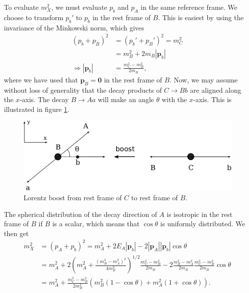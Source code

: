 \documentclass[twoside,english]{uiofysmaster}
\begin{document}
To evaluate $m_X^2$, we must evaluate $p_b$ and $p_A$ in the same reference frame. We choose to transform $p_b'$ to $p_b$ in the rest frame of $B$. This is easiest by using the invariance of the Minkowski norm, which gives
\begin{align}
	(p_b + p_B)^2 &= (p_b' + p_B')^2 = m_C^2\nonumber \\
				  &= m_B^2 + 2m_B|\mathbf{p}_b|\\
	\Rightarrow |\mathbf{p}_b| &= \frac{m_C^2 - m_B^2}{2m_B},\nonumber
\end{align}
where we have used that $\mathbf p_B = \mathbf{0}$ in the rest frame of $B$. Now, we may assume without loss of generality that the decay products of $C\to Bb$ are aligned along the $x$-axis. The decay $B\to Aa$ will make an angle $\theta$ with the $x$-axis. This is illustrated in figure \ref{fig:lorentz_boost}. 
\begin{figure}[hbt]
\centering
\includegraphics[scale=0.7]{figures/appendix/lorentz_boost.pdf}
\caption{Lorentz boost from rest frame of $C$ to rest frame of $B$.}
\label{fig:lorentz_boost}
\end{figure}
The spherical distribution of the decay direction of $A$ is isotropic in the rest frame of $B$ if $B$ is a scalar, which means that $\cos\theta$ is uniformly distributed. We then get
\begin{align}
	m_X^2 &= (p_A + p_b)^2 = m_A^2 + 2E_A|\mathbf{p}_b| - 2|\mathbf{p}_A||\mathbf{p}_b|\cos\theta\\
		&= m_A^2 + 2\left( m_A^2 + \frac{(m_B^2 - m_A^2)^2}{4m_B^2} \right)^{1/2}\frac{m_C^2 - m_B^2}{2m_B} -2\frac{m_B^2-m_A^2}{2m_B}\frac{m_C^2 - m_B^2}{2m_B}\cos\theta\nonumber \\
		&= m_A^2 + \frac{m_C^2 - m_B^2}{2m_B^2}\left( m_B^2(1-\cos\theta) + m_A^2(1+\cos\theta) \right).\nonumber
\end{align}
\end{document}
